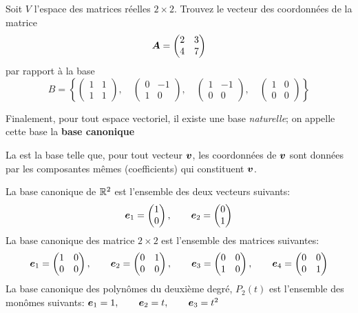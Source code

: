\begin{exerciceC}
Soit $V$ l'espace des matrices réelles $2\times2$. Trouvez le vecteur des coordonnées
de la matrice
\[
\boldsymbol{A} = \begin{pmatrix}
2 & 3\\
4 & 7
\end{pmatrix}
\]
par rapport à la base
\[
B = \left\{     
\begin{pmatrix}
1 & 1 \\
1 & 1
\end{pmatrix}, \quad
\begin{pmatrix}
0 & -1 \\
1 & 0
\end{pmatrix}, \quad
\begin{pmatrix}
1 & -1 \\
0 & 0
\end{pmatrix}, \quad
\begin{pmatrix}
1 & 0 \\
0 & 0
\end{pmatrix}
\right\}
\]
\end{exerciceC}

\medskip
Finalement, pour tout espace vectoriel, il existe une base \textit{naturelle}; on appelle cette base la \textbf{base canonique}
\medskip

\begin{defini}
La  est la base telle que, pour tout vecteur $\boldsymbol{v}$, les coordonnées de $\boldsymbol{v}$
sont données par les composantes mêmes (coefficients) qui constituent $\boldsymbol{v}$.  
\end{defini}
\begin{exemple}
 La base canonique de $\mathbb{R}^2$ est l'ensemble des deux vecteurs suivants:
\[
\boldsymbol{e}_1 = \begin{pmatrix}
1 \\ 0
\end{pmatrix}, \qquad
\boldsymbol{e}_2 = \begin{pmatrix}
0 \\ 1
\end{pmatrix}
\]
 La base canonique des matrice $2\times 2$ est l'ensemble des matrices suivantes:
\[
\boldsymbol{e}_1 = \begin{pmatrix}
1 & 0 \\
0 & 0
\end{pmatrix}, \qquad
\boldsymbol{e}_2 = \begin{pmatrix}
0 & 1 \\
0 & 0
\end{pmatrix}, \qquad
\boldsymbol{e}_3 = \begin{pmatrix}
0 & 0 \\
1 & 0
\end{pmatrix}, \qquad
\boldsymbol{e}_4 = \begin{pmatrix}
0 & 0 \\
0 & 1
\end{pmatrix}
\]
 La base canonique des polynômes du deuxième degré, $P_2(t)$ est l'ensemble des monômes suivants:
$
\boldsymbol{e}_1 = 1, \qquad \boldsymbol{e}_2 = t, \qquad \boldsymbol{e}_3 = t^2
$
\end{exemple}
\bigskip

